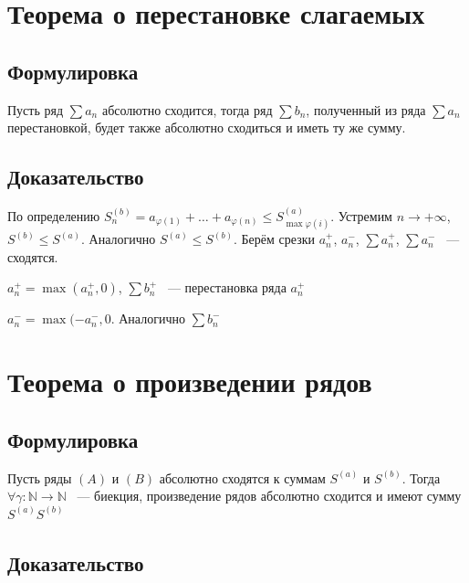 \documentclass{article}
\begin{document}
    \newpage
    
    \section{Теорема о перестановке слагаемых}
    
        \subsection{Формулировка}
        
            Пусть ряд $\sum a_n$ абсолютно сходится, тогда ряд $\sum b_n$, полученный из ряда $\sum a_n$ перестановкой, будет также абсолютно сходиться и иметь ту же сумму.
            
        \subsection{Доказательство}
        
            По определению $S_n^{(b)} = a_{\varphi(1)} + \ldots + a_{\varphi(n)} \leq S^{(a)}_{\max \varphi(i)}$. Устремим $n \rightarrow +\infty$, $S^{(b)} \leq S^{(a)}$. Аналогично $S^{(a)} \leq S^{(b)}$. Берём срезки $a_n^+$, $a_n^-$, $\sum a_n^+$, $\sum a_n^-$ ~--- сходятся.
            
            $a^+_n = \max(a^+_n, 0)$, $\sum b^+_n$ ~--- перестановка ряда $a^+_n$
            
            $a^-_n = \max(-a^-_n, 0$. Аналогично $\sum b^-_n$
            
    \newpage
    
    \section{Теорема о произведении рядов}
    
        \subsection{Формулировка}
        
            Пусть ряды $(A)$ и $(B)$ абсолютно сходятся к суммам $S^{(a)}$ и $S^{(b)}$. Тогда $\forall \gamma : \mathbb{N} \rightarrow \mathbb{N}$ ~--- биекция, произведение рядов абсолютно сходится и имеют сумму $S^{(a)} S^{(b)}$
            
        \subsection{Доказательство}
        
\end{document}

